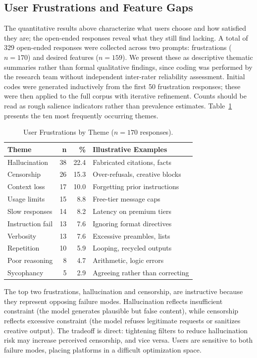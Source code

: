 \documentclass[10pt,twocolumn]{article}
\begin{document}
\subsection{User Frustrations and Feature Gaps}

The quantitative results above characterize what users choose and how satisfied they are; the open-ended responses reveal what they still find lacking. A total of 329 open-ended responses were collected across two prompts: frustrations ($n=170$) and desired features ($n=159$). We present these as descriptive thematic summaries rather than formal qualitative findings, since coding was performed by the research team without independent inter-rater reliability assessment. Initial codes were generated inductively from the first 50 frustration responses; these were then applied to the full corpus with iterative refinement. Counts should be read as rough salience indicators rather than prevalence estimates. Table~\ref{tab:frustrations} presents the ten most frequently occurring themes.

\begin{table}[t]
\centering
\caption{User Frustrations by Theme ($n=170$ responses).}
\label{tab:frustrations}
\small
\setlength{\tabcolsep}{4pt}
\begin{tabular}{lrrl}
\toprule
\textbf{Theme} & \textbf{n} & \textbf{\%} & \textbf{Illustrative Examples} \\
\midrule
Hallucination & 38 & 22.4 & Fabricated citations, facts \\
Censorship & 26 & 15.3 & Over-refusals, creative blocks \\
Context loss & 17 & 10.0 & Forgetting prior instructions \\
Usage limits & 15 & 8.8 & Free-tier message caps \\
Slow responses & 14 & 8.2 & Latency on premium tiers \\
Instruction fail & 13 & 7.6 & Ignoring format directives \\
Verbosity & 13 & 7.6 & Excessive preambles, lists \\
Repetition & 10 & 5.9 & Looping, recycled outputs \\
Poor reasoning & 8 & 4.7 & Arithmetic, logic errors \\
Sycophancy & 5 & 2.9 & Agreeing rather than correcting \\
\bottomrule
\end{tabular}
\end{table}

The top two frustrations, hallucination and censorship, are instructive because they represent opposing failure modes. Hallucination reflects insufficient constraint (the model generates plausible but false content), while censorship reflects excessive constraint (the model refuses legitimate requests or sanitizes creative output). The tradeoff is direct: tightening filters to reduce hallucination risk may increase perceived censorship, and vice versa. Users are sensitive to both failure modes, placing platforms in a difficult optimization space.
\end{document}
